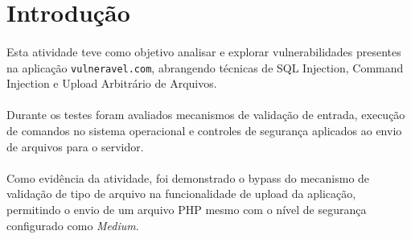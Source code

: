 \section{Introdução}

\paragraph{}
Esta atividade teve como objetivo analisar e explorar vulnerabilidades
presentes na aplicação \texttt{vulneravel.com}, abrangendo técnicas de SQL
Injection, Command Injection e Upload Arbitrário de Arquivos.

\paragraph{}
Durante os testes foram avaliados mecanismos de validação de entrada, execução
de comandos no sistema operacional e controles de segurança aplicados ao envio
de arquivos para o servidor.

\paragraph{}
Como evidência da atividade, foi demonstrado o bypass do mecanismo de validação
de tipo de arquivo na funcionalidade de upload da aplicação, permitindo o envio
de um arquivo PHP mesmo com o nível de segurança configurado como
\textit{Medium}.
